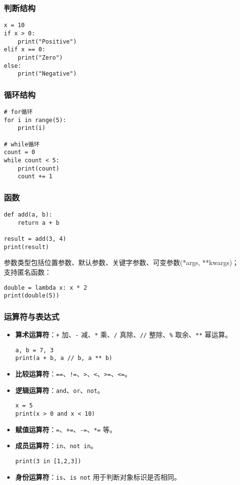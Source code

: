 \documentclass[a4paper,12pt]{ctexart}
\begin{document}
\subsubsection{判断结构}
\begin{lstlisting}
x = 10
if x > 0:
    print("Positive")
elif x == 0:
    print("Zero")
else:
    print("Negative")
\end{lstlisting}

\subsubsection{循环结构}
\begin{lstlisting}
# for循环
for i in range(5):
    print(i)

# while循环
count = 0
while count < 5:
    print(count)
    count += 1
\end{lstlisting}

\subsubsection{函数}
\begin{lstlisting}
def add(a, b):
    return a + b

result = add(3, 4)
print(result)
\end{lstlisting}
参数类型包括位置参数、默认参数、关键字参数、可变参数(*args, **kwargs)；  
支持匿名函数：
\begin{lstlisting}
double = lambda x: x * 2
print(double(5))
\end{lstlisting}

\subsubsection{运算符与表达式}
\begin{itemize}
  \item \textbf{算术运算符}：\texttt{+} 加、\texttt{-} 减、\texttt{*} 乘、\texttt{/} 真除、\texttt{//} 整除、\texttt{\%} 取余、\texttt{**} 幂运算。
\begin{lstlisting}
a, b = 7, 3
print(a + b, a // b, a ** b)
\end{lstlisting}
  \item \textbf{比较运算符}：\texttt{==}、\texttt{!=}、\texttt{>}、\texttt{<}、\texttt{>=}、\texttt{<=}。
  \item \textbf{逻辑运算符}：\texttt{and}、\texttt{or}、\texttt{not}。
\begin{lstlisting}
x = 5
print(x > 0 and x < 10)
\end{lstlisting}
  \item \textbf{赋值运算符}：\texttt{=}、\texttt{+=}、\texttt{-=}、\texttt{*=} 等。
  \item \textbf{成员运算符}：\texttt{in}、\texttt{not in}。
\begin{lstlisting}
print(3 in [1,2,3])
\end{lstlisting}
  \item \textbf{身份运算符}：\texttt{is}、\texttt{is not} 用于判断对象标识是否相同。
\end{itemize}
\end{document}
